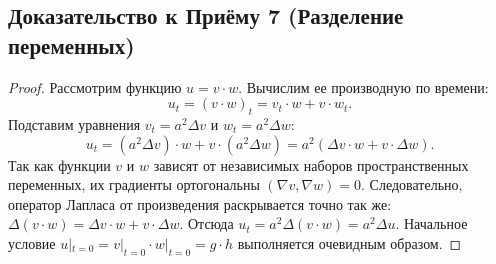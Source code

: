 \subsection*{Доказательство к Приёму 7 (Разделение переменных)}
\begin{proof}
Рассмотрим функцию $u = v \cdot w$. Вычислим ее производную по времени:
\[ u_t = (v \cdot w)_t = v_t \cdot w + v \cdot w_t. \]
Подставим уравнения $v_t = a^2 \Delta v$ и $w_t = a^2 \Delta w$:
\[ u_t = (a^2 \Delta v) \cdot w + v \cdot (a^2 \Delta w) = a^2 (\Delta v \cdot w + v \cdot \Delta w). \]
Так как функции $v$ и $w$ зависят от независимых наборов пространственных переменных, их градиенты ортогональны $(\nabla v, \nabla w) = 0$. Следовательно, оператор Лапласа от произведения раскрывается точно так же: $\Delta(v \cdot w) = \Delta v \cdot w + v \cdot \Delta w$.
Отсюда $u_t = a^2 \Delta(v \cdot w) = a^2 \Delta u$. Начальное условие $u|_{t=0} = v|_{t=0} \cdot w|_{t=0} = g \cdot h$ выполняется очевидным образом.
\end{proof}

